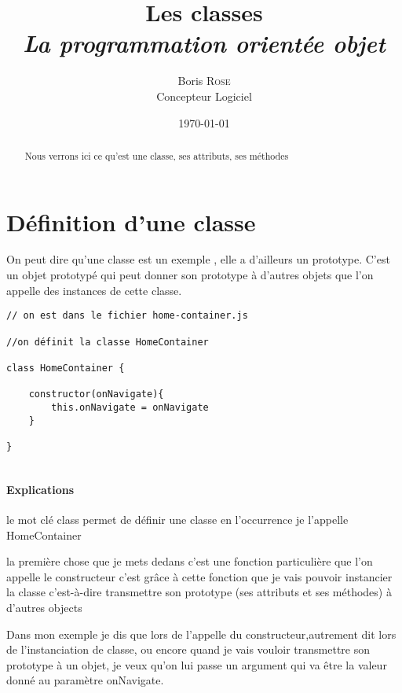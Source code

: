\documentclass[a4paper, 12pt]{report}
\begin{document}
\everymath{\displaystyle}
\title{\textbf{Les classes} \\ \textit{La programmation orientée objet}}
\author{Boris \textsc{Rose} \\ Concepteur Logiciel}
\date{\today}

\newcommand{\bshow}[1]{\textcolor{cyan}{#1}}


\maketitle

\begin{abstract}
Nous verrons ici ce qu'est une classe, ses attributs, ses méthodes
\end{abstract}


\section[short]{Définition d'une classe}

On peut dire qu'une classe est un exemple , elle a d'ailleurs un prototype. C'est un objet prototypé qui peut donner son prototype à d'autres objets que l'on appelle des instances de cette classe.

\begin{lstlisting}[style=mainlststyle]
// on est dans le fichier home-container.js

//on définit la classe HomeContainer 

class HomeContainer {

    constructor(onNavigate){
        this.onNavigate = onNavigate
    }

}


\end{lstlisting}

\paragraph{Explications}

le mot clé class permet de définir une classe en l'occurrence je l'appelle HomeContainer 

la première chose que je mets dedans c'est une fonction particulière que l'on appelle le constructeur c'est grâce à cette fonction que je vais pouvoir instancier la classe c'est-à-dire transmettre son prototype (ses attributs et ses méthodes) à d'autres objects


Dans mon exemple je dis que lors de l'appelle du constructeur,autrement dit lors de l'instanciation de classe, ou encore quand je vais vouloir transmettre son prototype à un objet, je veux qu'on lui passe un argument qui va être la valeur donné au paramètre onNavigate.
\end{document}
